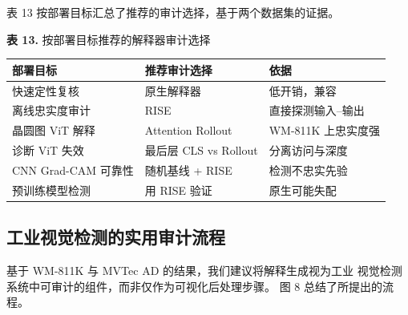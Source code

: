\documentclass[11pt,a4paper]{article}
\begin{document}
表 13 按部署目标汇总了推荐的审计选择，基于两个数据集的证据。

\begin{center}
\small \textbf{表 13.} 按部署目标推荐的解释器审计选择
\end{center}

\begin{tabular}{lll}
\toprule
部署目标 & 推荐审计选择 & 依据 \\
\midrule
快速定性复核 & 原生解释器 & 低开销，兼容 \\
离线忠实度审计 & RISE & 直接探测输入–输出 \\
晶圆图 ViT 解释 & Attention Rollout & WM-811K 上忠实度强 \\
诊断 ViT 失效 & 最后层 CLS vs Rollout & 分离访问与深度 \\
CNN Grad-CAM 可靠性 & 随机基线 + RISE & 检测不忠实先验 \\
预训练模型检测 & 用 RISE 验证 & 原生可能失配 \\
\bottomrule
\end{tabular}

\subsection{工业视觉检测的实用审计流程}

基于 WM-811K 与 MVTec AD 的结果，我们建议将解释生成视为工业 视觉检测系统中可审计的组件，而非仅作为可视化后处理步骤。 图 8 总结了所提出的流程。
\end{document}
